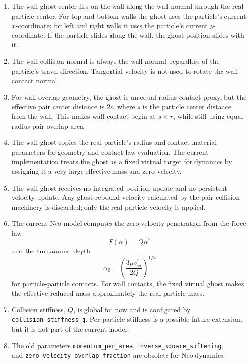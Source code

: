 \begin{enumerate}
    \item The wall ghost center lies on the wall along the wall normal through the real particle center. For top and bottom walls the ghost uses the particle's current \(x\)-coordinate; for left and right walls it uses the particle's current \(y\)-coordinate. If the particle slides along the wall, the ghost position slides with it.

    \item The wall collision normal is always the wall normal, regardless of the particle's travel direction. Tangential velocity is not used to rotate the wall contact normal.

    \item For wall overlap geometry, the ghost is an equal-radius contact proxy, but the effective pair center distance is \(2s\), where \(s\) is the particle center distance from the wall. This makes wall contact begin at \(s < r\), while still using equal-radius pair overlap area.

    \item The wall ghost copies the real particle's radius and contact material parameters for geometry and contact-law evaluation. The current implementation treats the ghost as a fixed virtual target for dynamics by assigning it a very large effective mass and zero velocity.

    \item The wall ghost receives no integrated position update and no persistent velocity update. Any ghost rebound velocity calculated by the pair collision machinery is discarded; only the real particle velocity is applied.

    \item The current Neo model computes the zero-velocity penetration from the force law
    \[
        F(\alpha) = Q \alpha^2
    \]
    and the turnaround depth
    \[
        \alpha_0 = \left(\frac{3 \mu v_{in}^2}{2Q}\right)^{1/3}
    \]
    for particle-particle contacts. For wall contacts, the fixed virtual ghost makes the effective reduced mass approximately the real particle mass.

    \item Collision stiffness, \(Q\), is global for now and is configured by \texttt{collision\_stiffness\_q}. Per-particle stiffness is a possible future extension, but it is not part of the current model.

    \item The old parameters \texttt{momentum\_per\_area}, \texttt{inverse\_square\_softening},\\ and \texttt{zero\_velocity\_overlap\_fraction} are obsolete for Neo dynamics.


\end{enumerate}
